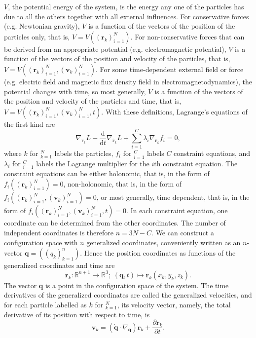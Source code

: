 \documentclass[a4paper,12pt]{article}
\begin{document}
$V$, the potential energy of the system, is the energy any one of the particles has due to all the others together with all external influences. For conservative forces (e.g. Newtonian gravity), $V$ is a function of the vectors of the position of the particles only, that is, $V=V((\mathbf{r}_k)_{i=1}^N)$. For non-conservative forces that can be derived from an appropriate potential (e.g. electromagnetic potential), $V$ is a function of the vectors of the position and velocity of the particles, that is, $V=V((\mathbf{r}_k)_{i=1}^N,(\mathbf{v}_k)_{i=1}^N)$. For some time-dependent external field or force (e.g. electric field and magnetic flux density field in electromagnetodynamics), the potential changes with time, so most generally, $V$ is a function of the vectors of the position and velocity of the particles and time, that is, $V=V((\mathbf{r}_k)_{i=1}^N,(\mathbf{v}_k)_{i=1}^N,t)$.
With these definitions, Lagrange's equations of the first kind are
\[\nabla_{\mathbf{r}_k}L-\frac{\mathrm{d}}{\mathrm{d}t}\nabla_{\dot{\mathbf{r}_k}}L+\sum_{i=1}^C\lambda_i\nabla_{\mathbf{r}_k}f_i=0,\]
where $k$ for $_{k=1}^N$ labels the particles, $f_i$ for $_{i=1}^C$ labels $C$ constraint equations, and $\lambda_i$ for $_{i=1}^C$ labels the Lagrange multiplier for the $i$th constraint equation. The constraint equations can be either holonomic, that is, in the form of $f_i((\mathbf{r}_k)_{i=1}^N)=0$, non-holonomic, that is, in the form of $f_i((\mathbf{r}_k)_{i=1}^N,(\mathbf{v}_k)_{i=1}^N)=0$, or most generally, time dependent, that is, in the form of $f_i((\mathbf{r}_k)_{i=1}^N,(\mathbf{v}_k)_{i=1}^N,t)=0$.
In each constraint equation, one coordinate can be determined from the other coordinates. The number of independent coordinates is therefore $n = 3N − C$. We can construct a configuration space with $n$ generalized coordinates,  conveniently written as an $n$-vector $\mathbf{q} = ((q_k)_{k=1}^n)$. Hence the position coordinates as functions of the generalized coordinates and time are
\[\mathbf{r}_k\colon\mathbb{R}^{n+1}\to\mathbb{R}^3;\;(\mathbf{q},t)\mapsto\mathbf{r}_k(x_k,y_k,z_k).\]
The vector $\mathbf{q}$ is a point in the configuration space of the system. The time derivatives of the generalized coordinates are called the generalized velocities, and for each particle labelled as $k$ for $_{k=1}^N$, its velocity vector, namely, the total derivative of its position with respect to time, is
\[\mathbf{v}_k=\left(\dot{\mathbf{q}}\cdot\nabla_{\mathbf{q}}\right)\mathbf{r}_k+\frac{\partial\mathbf{r}_k}{\partial t}.\]
\end{document}
